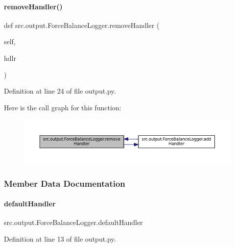 \paragraph{\texorpdfstring{remove\+Handler()}{removeHandler()}}
{\footnotesize\ttfamily def src.\+output.\+Force\+Balance\+Logger.\+remove\+Handler (\begin{DoxyParamCaption}\item[{}]{self,  }\item[{}]{hdlr }\end{DoxyParamCaption})}



Definition at line 24 of file output.\+py.

Here is the call graph for this function\+:
\nopagebreak
\begin{figure}[H]
\begin{center}
\leavevmode
\includegraphics[width=350pt]{classsrc_1_1output_1_1ForceBalanceLogger_a8be21b79e392b07a93e1718be22b437c_cgraph}
\end{center}
\end{figure}


\subsubsection{Member Data Documentation}
\mbox{\label{classsrc_1_1output_1_1ForceBalanceLogger_a02e7ca6f9f9a5daaa2d2f27457e9c1b2}} 
\paragraph{\texorpdfstring{default\+Handler}{defaultHandler}}
{\footnotesize\ttfamily src.\+output.\+Force\+Balance\+Logger.\+default\+Handler}



Definition at line 13 of file output.\+py.

\mbox{\label{classsrc_1_1output_1_1ForceBalanceLogger_a2da24df00a411d1603fcaf2ebef8161f}} 

